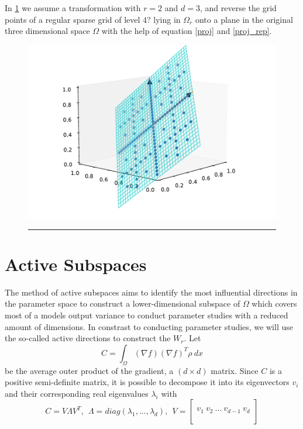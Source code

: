 \documentclass[
  a4paper,  %
  twoside,  %
  bibliography=totoc,
  headsepline,
  cleardoublepage=empty,
  parskip=half,
  draft=false
]{scrbook}
\newcommand{\delimit}{{\color{charcoal}\noindent\rule{\textwidth}{1pt}}}
\begin{document}
In \cref{fig:trans_vis} we assume a transformation with $r=2$ and $d=3$, and reverse the grid points of a regular sparse grid of level $4$? lying in $\Omega_r$ onto a plane in the original three dimensional space $\Omega$ with the help of equation \cref{proj} and \cref{proj_rep}.


\begin{mdframed}[style=style]
\begin{figure}[H]
\centering
  \includegraphics[width=.7\linewidth]{graphics/surrogate_vis}
  \delimit
  \label{fig:trans_vis}
\end{figure}
\end{mdframed}

\section{Active Subspaces}


The method of active subspaces \cite{CG15} aims to identify the most influential directions in the parameter space to construct a lower-dimensional subspace of $\Omega$ which covers most of a models output variance to conduct parameter studies with a reduced amount of dimensions.
In constrast to conducting parameter studies, we will use the so-called active directions to construct the $W_r$.
Let
\begin{equation}
C = \int_{\Omega} (\nabla f) (\nabla f)^T \rho ~ dx
\label{as_c}
\end{equation}
be the average outer product of the gradient, a $(d \times d)$ matrix.
Since $C$ is a positive semi-definite matrix, it is possible to decompose it into its eigenvectors $v_i$ and their corresponding real eigenvalues $\lambda_i$ with
\begin{equation}
C = V \Lambda V^T, ~~ \Lambda = diag(\lambda_1, ..., \lambda_d), ~~ V=
  \begin{bmatrix}
  \\
    v_1 ~ v_2 ~ \dots ~ v_{d-1} ~ v_d\\
    \\
  \end{bmatrix}
\nonumber
\end{equation}
\end{document}
